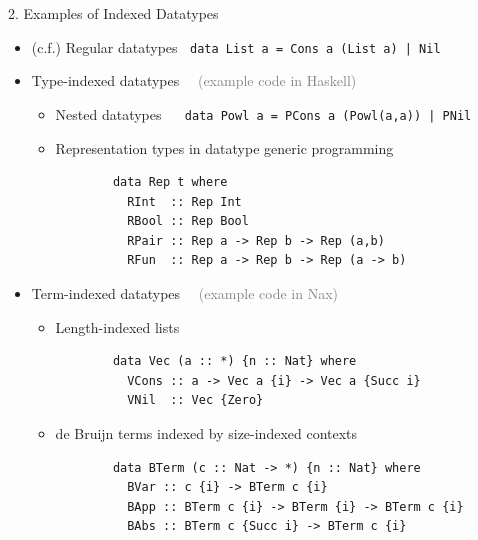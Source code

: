 \documentclass[final]{beamer}
\begin{document}
\begin{frame}[fragile]
\begin{columns}[t]
\begin{column}{.485\linewidth}
\begin{block}{2. Examples of Indexed Datatypes}
\begin{itemize}
\item[]$\!\!\!\!\!\!${\normalsize(c.f.)} Regular datatypes
	$~$ \lstinline!data List a = Cons a (List a) | Nil!
\item Type-indexed datatypes
	$\quad$\textcolor{gray}{\normalsize(example code in Haskell)}
	\begin{itemize}
		\item Nested datatypes $\quad$
			\lstinline!data Powl a = PCons a (Powl(a,a)) | PNil!
		\item Representation types in datatype generic programming
		\begin{lstlisting}
		data Rep t where
		  RInt  :: Rep Int
		  RBool :: Rep Bool
		  RPair :: Rep a -> Rep b -> Rep (a,b)
		  RFun  :: Rep a -> Rep b -> Rep (a -> b)
		\end{lstlisting}
	\end{itemize}
\item Term-indexed datatypes
	$\quad$\textcolor{gray}{\normalsize(example code in Nax)}
	\begin{itemize}
        	\item Length-indexed lists
		\begin{lstlisting}
		data Vec (a :: *) {n :: Nat} where
		  VCons :: a -> Vec a {i} -> Vec a {Succ i}
		  VNil  :: Vec {Zero}
		\end{lstlisting}
		\item de Bruijn terms indexed by size-indexed contexts
		\begin{lstlisting}
		data BTerm (c :: Nat -> *) {n :: Nat} where
		  BVar :: c {i} -> BTerm c {i}
		  BApp :: BTerm c {i} -> BTerm {i} -> BTerm c {i}
		  BAbs :: BTerm c {Succ i} -> BTerm c {i}
		\end{lstlisting}
	\end{itemize}
\end{itemize} %
\end{block}


\end{column}
\end{columns}
\end{frame}
\end{document}
